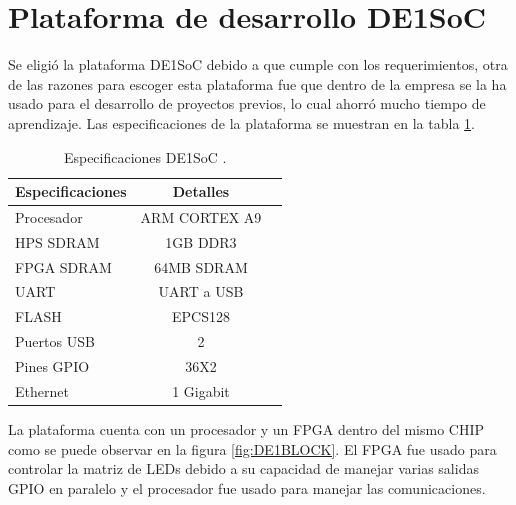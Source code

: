 


\section{ Plataforma de desarrollo DE1SoC}
Se eligió la plataforma DE1SoC debido a que cumple con los requerimientos, otra de las razones para escoger esta plataforma fue que dentro de la empresa se la ha usado para el desarrollo de proyectos previos, lo cual ahorró mucho tiempo de aprendizaje. Las especificaciones de la plataforma se muestran en la tabla \ref{tab:DE1SOCTABLA}.

\begin{table}[h]
\centering
\caption[Especificaciones DE1SoC]{Especificaciones DE1SoC \protect\footnotemark.}
\begin{tabular}{l c c}
\toprule
\textbf{Especificaciones}& \textbf{Detalles}\\
\midrule 


Procesador & ARM CORTEX A9\\
HPS SDRAM & 1GB DDR3\\
FPGA SDRAM & 64MB SDRAM\\
UART & UART a USB\\
FLASH & EPCS128\\
Puertos USB & 2\\
Pines GPIO & 36X2\\
Ethernet & 1 Gigabit\\


\bottomrule
\hline
\end{tabular}
\label{tab:DE1SOCTABLA}
\end{table}


La plataforma cuenta con un procesador y un FPGA dentro del mismo CHIP como se puede observar en la figura  \ref{fig:DE1BLOCK}. El FPGA fue usado para controlar la matriz de LEDs debido a su capacidad de manejar varias salidas GPIO en paralelo y el procesador fue usado para manejar las comunicaciones.

